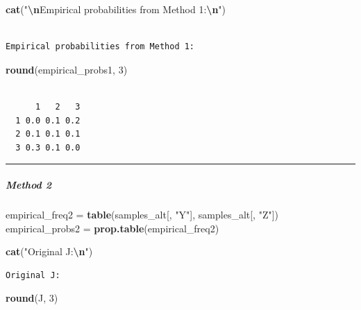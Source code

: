 \documentclass[
]{article}
\newenvironment{Shaded}{\begin{snugshade}}{\end{snugshade}}
\newcommand{\DecValTok}[1]{\textcolor[rgb]{0.00,0.00,0.81}{#1}}
\newcommand{\FunctionTok}[1]{\textcolor[rgb]{0.13,0.29,0.53}{\textbf{#1}}}
\newcommand{\NormalTok}[1]{#1}
\newcommand{\OtherTok}[1]{\textcolor[rgb]{0.56,0.35,0.01}{#1}}
\newcommand{\SpecialCharTok}[1]{\textcolor[rgb]{0.81,0.36,0.00}{\textbf{#1}}}
\newcommand{\StringTok}[1]{\textcolor[rgb]{0.31,0.60,0.02}{#1}}
\begin{document}
\begin{Shaded}
\begin{Highlighting}[]
\FunctionTok{cat}\NormalTok{(}\StringTok{"}\SpecialCharTok{\textbackslash{}n}\StringTok{Empirical probabilities from Method 1:}\SpecialCharTok{\textbackslash{}n}\StringTok{"}\NormalTok{)}
\end{Highlighting}
\end{Shaded}

\begin{verbatim}

Empirical probabilities from Method 1:
\end{verbatim}

\begin{Shaded}
\begin{Highlighting}[]
\FunctionTok{round}\NormalTok{(empirical\_probs1, }\DecValTok{3}\NormalTok{)}
\end{Highlighting}
\end{Shaded}

\begin{verbatim}
   
      1   2   3
  1 0.0 0.1 0.2
  2 0.1 0.1 0.1
  3 0.3 0.1 0.0
\end{verbatim}

\begin{center}\rule{0.5\linewidth}{0.5pt}\end{center}

\subparagraph{Method 2}\label{method-2}

\begin{Shaded}
\begin{Highlighting}[]
\NormalTok{empirical\_freq2 }\OtherTok{=} \FunctionTok{table}\NormalTok{(samples\_alt[, }\StringTok{"Y"}\NormalTok{], samples\_alt[, }\StringTok{"Z"}\NormalTok{])}
\NormalTok{empirical\_probs2 }\OtherTok{=} \FunctionTok{prop.table}\NormalTok{(empirical\_freq2)}

\FunctionTok{cat}\NormalTok{(}\StringTok{"Original J:}\SpecialCharTok{\textbackslash{}n}\StringTok{"}\NormalTok{)}
\end{Highlighting}
\end{Shaded}

\begin{verbatim}
Original J:
\end{verbatim}

\begin{Shaded}
\begin{Highlighting}[]
\FunctionTok{round}\NormalTok{(J, }\DecValTok{3}\NormalTok{)}
\end{Highlighting}
\end{Shaded}
\end{document}
